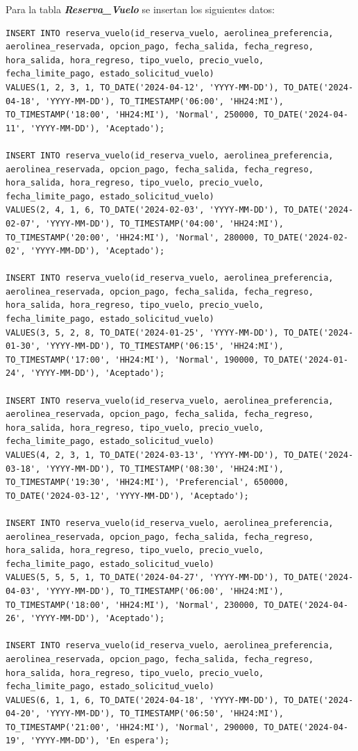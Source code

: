 \documentclass{article}
\begin{document}
Para la tabla \textit{\textbf{Reserva\_Vuelo}} se insertan los siguientes datos:

\begin{lstlisting}
INSERT INTO reserva_vuelo(id_reserva_vuelo, aerolinea_preferencia, aerolinea_reservada, opcion_pago, fecha_salida, fecha_regreso, hora_salida, hora_regreso, tipo_vuelo, precio_vuelo, fecha_limite_pago, estado_solicitud_vuelo)
VALUES(1, 2, 3, 1, TO_DATE('2024-04-12', 'YYYY-MM-DD'), TO_DATE('2024-04-18', 'YYYY-MM-DD'), TO_TIMESTAMP('06:00', 'HH24:MI'), TO_TIMESTAMP('18:00', 'HH24:MI'), 'Normal', 250000, TO_DATE('2024-04-11', 'YYYY-MM-DD'), 'Aceptado');

INSERT INTO reserva_vuelo(id_reserva_vuelo, aerolinea_preferencia, aerolinea_reservada, opcion_pago, fecha_salida, fecha_regreso, hora_salida, hora_regreso, tipo_vuelo, precio_vuelo, fecha_limite_pago, estado_solicitud_vuelo)
VALUES(2, 4, 1, 6, TO_DATE('2024-02-03', 'YYYY-MM-DD'), TO_DATE('2024-02-07', 'YYYY-MM-DD'), TO_TIMESTAMP('04:00', 'HH24:MI'), TO_TIMESTAMP('20:00', 'HH24:MI'), 'Normal', 280000, TO_DATE('2024-02-02', 'YYYY-MM-DD'), 'Aceptado');

INSERT INTO reserva_vuelo(id_reserva_vuelo, aerolinea_preferencia, aerolinea_reservada, opcion_pago, fecha_salida, fecha_regreso, hora_salida, hora_regreso, tipo_vuelo, precio_vuelo, fecha_limite_pago, estado_solicitud_vuelo)
VALUES(3, 5, 2, 8, TO_DATE('2024-01-25', 'YYYY-MM-DD'), TO_DATE('2024-01-30', 'YYYY-MM-DD'), TO_TIMESTAMP('06:15', 'HH24:MI'), TO_TIMESTAMP('17:00', 'HH24:MI'), 'Normal', 190000, TO_DATE('2024-01-24', 'YYYY-MM-DD'), 'Aceptado');

INSERT INTO reserva_vuelo(id_reserva_vuelo, aerolinea_preferencia, aerolinea_reservada, opcion_pago, fecha_salida, fecha_regreso, hora_salida, hora_regreso, tipo_vuelo, precio_vuelo, fecha_limite_pago, estado_solicitud_vuelo)
VALUES(4, 2, 3, 1, TO_DATE('2024-03-13', 'YYYY-MM-DD'), TO_DATE('2024-03-18', 'YYYY-MM-DD'), TO_TIMESTAMP('08:30', 'HH24:MI'), TO_TIMESTAMP('19:30', 'HH24:MI'), 'Preferencial', 650000, TO_DATE('2024-03-12', 'YYYY-MM-DD'), 'Aceptado');

INSERT INTO reserva_vuelo(id_reserva_vuelo, aerolinea_preferencia, aerolinea_reservada, opcion_pago, fecha_salida, fecha_regreso, hora_salida, hora_regreso, tipo_vuelo, precio_vuelo, fecha_limite_pago, estado_solicitud_vuelo)
VALUES(5, 5, 5, 1, TO_DATE('2024-04-27', 'YYYY-MM-DD'), TO_DATE('2024-04-03', 'YYYY-MM-DD'), TO_TIMESTAMP('06:00', 'HH24:MI'), TO_TIMESTAMP('18:00', 'HH24:MI'), 'Normal', 230000, TO_DATE('2024-04-26', 'YYYY-MM-DD'), 'Aceptado');

INSERT INTO reserva_vuelo(id_reserva_vuelo, aerolinea_preferencia, aerolinea_reservada, opcion_pago, fecha_salida, fecha_regreso, hora_salida, hora_regreso, tipo_vuelo, precio_vuelo, fecha_limite_pago, estado_solicitud_vuelo)
VALUES(6, 1, 1, 6, TO_DATE('2024-04-18', 'YYYY-MM-DD'), TO_DATE('2024-04-20', 'YYYY-MM-DD'), TO_TIMESTAMP('06:50', 'HH24:MI'), TO_TIMESTAMP('21:00', 'HH24:MI'), 'Normal', 290000, TO_DATE('2024-04-19', 'YYYY-MM-DD'), 'En espera');
\end{lstlisting}
\end{document}
